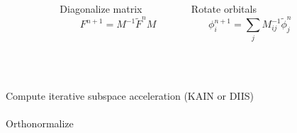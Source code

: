 \begin{frame}
{\begin{columns}
    \begin{column}[b]{0.1\textwidth}
    \ \\
    \end{column}
    \begin{column}[b]{0.4\textwidth}
    \centering
    Diagonalize matrix
    \begin{equation}
	\nonumber
	F^{n+1} = M^{-1}\tilde{F}^nM
    \end{equation}
    \end{column}
    \begin{column}[b]{0.4\textwidth}
    \centering
    Rotate orbitals
    \begin{equation}
	\nonumber
	\phi_i^{n+1} = \sum_jM^{-1}_{ij}\tilde{\phi}_j^n
    \end{equation}
    \end{column}
    \begin{column}[b]{0.1\textwidth}
    \ \\
    \end{column}
    \end{columns}
    \ \\
    \ \\
    \pause
    Compute iterative subspace acceleration (KAIN or DIIS)\\
    \ \\
    Orthonormalize\\
    \ \\
    }
\end{frame}

